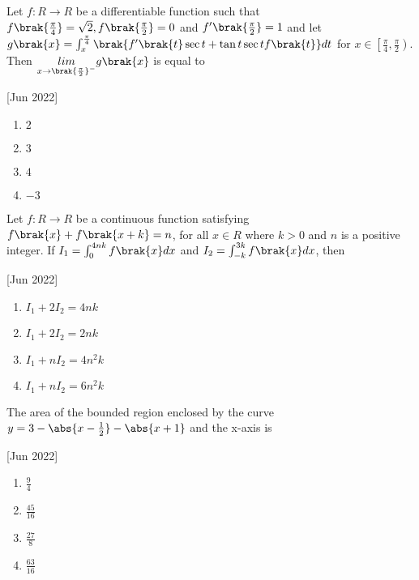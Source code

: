    \item Let $f:R\to R$ be a differentiable function such that $f\brak{\frac{\pi}{4}}=\sqrt{2},f\brak{\frac{\pi}{2}}=0$ and $f'\brak{\frac{\pi}{2}}=1$ and let $g\brak{x}=\int_x^{\frac{\pi}{4}}\brak{f'\brak{t}\sec t+\tan t\sec tf\brak{t}}dt$ for $x\in \left[ \frac{\pi}{4},\frac{\pi}{2}\right)$. Then $\underset{x\to\brak{\frac{\pi}{2}}^{-}}{lim}g\brak{x}$ is equal to
    
    \hfill[Jun 2022]

        \begin{multicols}{4}
            \begin{enumerate}
                \item $2$
                \item $3$
                \item $4$
                \item $-3$
            \end{enumerate}
        \end{multicols}
		
    \item Let $f:R\to R$ be a continuous function satisfying $f\brak{x}+f\brak{x+k}=n$, for all $x\in R$ where $k>0$ and $n$ is a positive integer. If $I_1=\int_0^{4nk}f\brak{x}dx$ and $I_2=\int_{-k}^{3k}f\brak{x}dx$, then
    
    \hfill[Jun 2022]

        \begin{multicols}{4}
            \begin{enumerate}
                \item $I_1+2I_2=4nk$
                \item $I_1+2I_2=2nk$
                \item $I_1+nI_2=4n^2k$
                \item $I_1+nI_2=6n^2k$
            \end{enumerate}
        \end{multicols}

    \item The area of the bounded region enclosed by the curve $y=3-\abs{x-\frac{1}{2}}-\abs{x+1}$ and the x-axis is
    
    \hfill[Jun 2022]

        \begin{multicols}{4}
            \begin{enumerate}
                \item $\frac{9}{4}$
                \item $\frac{45}{16}$
                \item $\frac{27}{8}$
                \item $\frac{63}{16}$
            \end{enumerate}
        \end{multicols}


